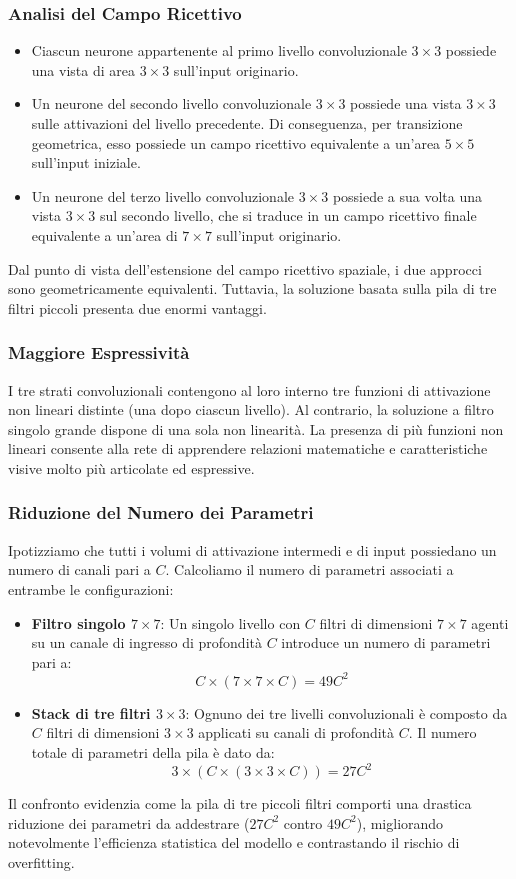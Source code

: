 ﻿\documentclass[11pt, a4paper]{article}
\begin{document}
\subsubsection{Analisi del Campo Ricettivo}
\begin{itemize}
    \item Ciascun neurone appartenente al primo livello convoluzionale $3 \times 3$ possiede una vista di area $3 \times 3$ sull'input originario.
    \item Un neurone del secondo livello convoluzionale $3 \times 3$ possiede una vista $3 \times 3$ sulle attivazioni del livello precedente. Di conseguenza, per transizione geometrica, esso possiede un campo ricettivo equivalente a un'area $5 \times 5$ sull'input iniziale.
    \item Un neurone del terzo livello convoluzionale $3 \times 3$ possiede a sua volta una vista $3 \times 3$ sul secondo livello, che si traduce in un campo ricettivo finale equivalente a un'area di $7 \times 7$ sull'input originario.
\end{itemize}
Dal punto di vista dell'estensione del campo ricettivo spaziale, i due approcci sono geometricamente equivalenti. Tuttavia, la soluzione basata sulla pila di tre filtri piccoli presenta due enormi vantaggi.

\subsubsection{Maggiore Espressività}
I tre strati convoluzionali contengono al loro interno tre funzioni di attivazione non lineari distinte (una dopo ciascun livello). Al contrario, la soluzione a filtro singolo grande dispone di una sola non linearità. La presenza di più funzioni non lineari consente alla rete di apprendere relazioni matematiche e caratteristiche visive molto più articolate ed espressive.

\subsubsection{Riduzione del Numero dei Parametri}
Ipotizziamo che tutti i volumi di attivazione intermedi e di input possiedano un numero di canali pari a $C$. Calcoliamo il numero di parametri associati a entrambe le configurazioni:
\begin{itemize}
    \item \textbf{Filtro singolo $7 \times 7$}: Un singolo livello con $C$ filtri di dimensioni $7 \times 7$ agenti su un canale di ingresso di profondità $C$ introduce un numero di parametri pari a:
    \[
    C \times (7 \times 7 \times C) = 49C^2
    \]
    \item \textbf{Stack di tre filtri $3 \times 3$}: Ognuno dei tre livelli convoluzionali è composto da $C$ filtri di dimensioni $3 \times 3$ applicati su canali di profondità $C$. Il numero totale di parametri della pila è dato da:
    \[
    3 \times (C \times (3 \times 3 \times C)) = 27C^2
    \]
\end{itemize}
Il confronto evidenzia come la pila di tre piccoli filtri comporti una drastica riduzione dei parametri da addestrare ($27C^2$ contro $49C^2$), migliorando notevolmente l'efficienza statistica del modello e contrastando il rischio di overfitting.
\end{document}
